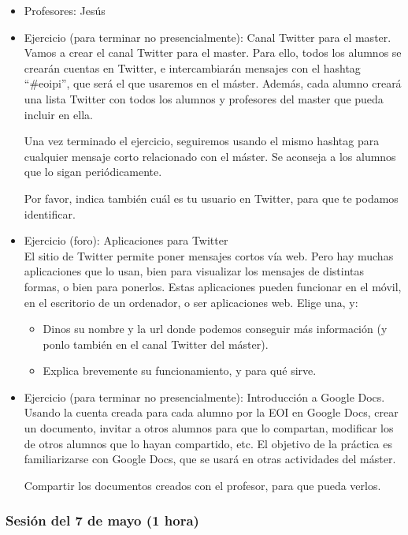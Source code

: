 \documentclass[a4paper,12pt]{article}
\begin{document}
\begin{itemize}
\item Profesores: Jesús
\item Ejercicio (para terminar no presencialmente): Canal Twitter para el master. \\
Vamos a crear el canal Twitter para el master. Para ello, todos los alumnos se crearán cuentas en Twitter, e intercambiarán mensajes con el hashtag ``\#eoipi'', que será el que usaremos en el máster. Además, cada alumno creará una lista Twitter con todos los alumnos y profesores del master que pueda incluir en ella.

Una vez terminado el ejercicio, seguiremos usando el mismo hashtag para cualquier mensaje corto relacionado con el máster. Se aconseja a los alumnos que lo sigan periódicamente.

Por favor, indica también cuál es tu usuario en Twitter, para que te podamos identificar.
\item Ejercicio (foro): Aplicaciones para Twitter \\
  El sitio de Twitter permite poner mensajes cortos vía web. Pero hay muchas aplicaciones que lo usan, bien para visualizar los mensajes de distintas formas, o bien para ponerlos. Estas aplicaciones pueden funcionar en el móvil, en el escritorio de un ordenador, o ser aplicaciones web. Elige una, y:

  \begin{itemize}
  \item Dinos su nombre y la url donde podemos conseguir más información (y ponlo también en el canal Twitter del máster).
  \item Explica brevemente su funcionamiento, y para qué sirve.
  \end{itemize}

\item Ejercicio (para terminar no presencialmente): Introducción a Google Docs. \\
Usando la cuenta creada para cada alumno por la EOI en Google Docs, crear un documento, invitar a otros alumnos para que lo compartan, modificar los de otros alumnos que lo hayan compartido, etc. El objetivo de la práctica es familiarizarse con Google Docs, que se usará en otras actividades del máster.

Compartir los documentos creados con el profesor, para que pueda verlos.
\end{itemize}

\subsubsection{Sesión del 7 de mayo (1 hora)}
\end{document}

